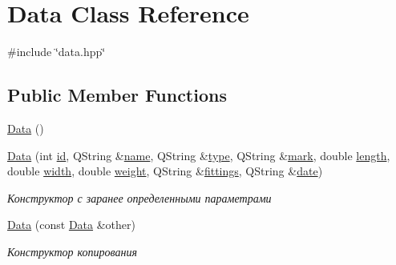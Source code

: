 \hypertarget{class_data}{}\section{Data Class Reference}
\label{class_data}


{\ttfamily \#include \char`\"{}data.\+hpp\char`\"{}}

\subsection*{Public Member Functions}
\begin{DoxyCompactItemize}
\item 
\mbox{\hyperlink{class_data_af11f741cb7f587e2e495452a8905a22a}{Data}} ()
\item 
\mbox{\label{class_data_a2e5f1e9842609bc5feade75a39cadbc3}} 
\mbox{\hyperlink{class_data_a2e5f1e9842609bc5feade75a39cadbc3}{Data}} (int \mbox{\hyperlink{class_data_a1038027623494cd8010c2da6dc4931cf}{id}}, Q\+String \&\mbox{\hyperlink{class_data_a26474da0b1d12f2c859c3f5c1b0319cd}{name}}, Q\+String \&\mbox{\hyperlink{class_data_af9f18d58205e8ffe53ef3ebd7142df39}{type}}, Q\+String \&\mbox{\hyperlink{class_data_ac42443978dbd444351eaa3411dd2eb29}{mark}}, double \mbox{\hyperlink{class_data_a99618bdc2d9259373ecdf185f75caabf}{length}}, double \mbox{\hyperlink{class_data_ae7a24cb64fc28f87f3b2cd1b0a447d25}{width}}, double \mbox{\hyperlink{class_data_a6c25bf523edd42b47dd8495307273594}{weight}}, Q\+String \&\mbox{\hyperlink{class_data_a4d9e20ab733af7e52714c7e817c8f69c}{fittings}}, Q\+String \&\mbox{\hyperlink{class_data_ab4fdaff8b80270296a56be3702b5260d}{date}})
\begin{DoxyCompactList}\small\item\em Конструктор с заранее определенными параметрами \end{DoxyCompactList}\item 
\mbox{\label{class_data_a0a6006d6052c8224749bbce584f403ea}} 
\mbox{\hyperlink{class_data_a0a6006d6052c8224749bbce584f403ea}{Data}} (const \mbox{\hyperlink{class_data}{Data}} \&other)
\begin{DoxyCompactList}\small\item\em Конструктор копирования \end{DoxyCompactList}\item 
\mbox{\label{class_data_a9237598fe3cfc3595f10cfeec8a978ea}} 

\end{DoxyCompactItemize}

